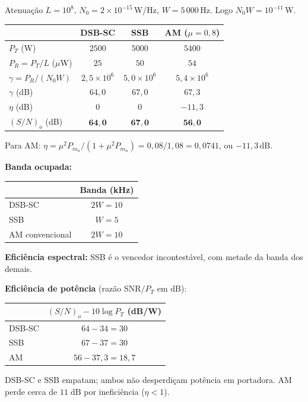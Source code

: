 \documentclass[11pt,a4paper]{article}
\begin{document}
\begin{resolucao}

Atenuação $L = 10^8$, $N_0 = 2\times 10^{-15}$\,W/Hz, $W = 5\,000$\,Hz. Logo $N_0 W = 10^{-11}$\,W.

\begin{center}
\small
\begin{tabular}{lccc}
\toprule
& DSB-SC & SSB & AM ($\mu=0{,}8$) \\
\midrule
$P_T$ (W) & $2500$ & $5000$ & $5400$ \\
$P_R = P_T/L$ ($\mu$W) & $25$ & $50$ & $54$ \\
$\gamma = P_R/(N_0 W)$ & $2{,}5\times 10^6$ & $5{,}0\times 10^6$ & $5{,}4\times 10^6$ \\
$\gamma$ (dB) & $64{,}0$ & $67{,}0$ & $67{,}3$ \\
$\eta$ (dB) & $0$ & $0$ & $-11{,}3$ \\
$(S/N)_o$ (dB) & $\mathbf{64{,}0}$ & $\mathbf{67{,}0}$ & $\mathbf{56{,}0}$ \\
\bottomrule
\end{tabular}
\end{center}

Para AM: $\eta = \mu^2 P_{m_n}/(1 + \mu^2 P_{m_n}) = 0{,}08/1{,}08 = 0{,}0741$, ou $-11{,}3$\,dB.
\end{resolucao}

\begin{resolucao}

\textbf{Banda ocupada:}
\begin{center}
\begin{tabular}{lc}
\toprule
& Banda (kHz) \\
\midrule
DSB-SC & $2W = 10$ \\
SSB & $W = 5$ \\
AM convencional & $2W = 10$ \\
\bottomrule
\end{tabular}
\end{center}

\textbf{Eficiência espectral:} SSB é o vencedor incontestável, com metade da banda dos demais.

\textbf{Eficiência de potência} (razão SNR$/P_T$ em dB):
\begin{center}
\begin{tabular}{lc}
\toprule
& $(S/N)_o - 10\log P_T$ (dB/W) \\
\midrule
DSB-SC & $64 - 34 = 30$ \\
SSB & $67 - 37 = 30$ \\
AM & $56 - 37{,}3 = 18{,}7$ \\
\bottomrule
\end{tabular}
\end{center}

DSB-SC e SSB empatam; ambos não desperdiçam potência em portadora. AM perde cerca de $11\;\text{dB}$ por ineficiência ($\eta < 1$).
\end{resolucao}
\end{document}
